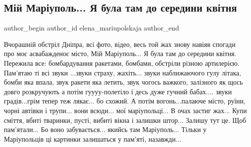  
 
 
 
 

\subsection{Мій Маріуполь... Я була там до середини квітня}
\label{sec:27_05_2023.fb.elena_mariupolskaja.1.mij_mariupol_ja_bula_tam_do_seredyny_kvitnja}

\ifcmt
 author_begin
   author_id elena_mariupolskaja
 author_end
\fi

Вчорашній обстріл Дніпра, всі фото, відео, весь той жах знову навіяв спогади про
моє асвабажденоє місто, Мій Маріуполь... Я була там до середини квітня. Пережила
все: бомбардування ракетами, бомбами, обстріли різною артилерією. Пам'ятаю ті
всі звуки ...звуки страху, жахіть... звуки наближаючого гулу літака, бомби яка
впала, звук ракети яка летить, звук чогось важкого, залізного як щось довго
розкручують а потім гуууу-полетіло і десь дуже гучний бабах.... звуки
градів...грім тепер теж лякає... бо схожий. А потім вогонь...палаюче місто,
руїни, чорні автівки і трупи... вони всюди... мої  маріупольці... В очах застиг
жах... Купи сміття, вбиті тваринки, пусті, вибиті вікна і залишки штор... Залишу
тут це. Щоб пам'ятали... Бо воно забувається... якийсь там Маріуполь... Тільки у
Маріупольців ці картинки залишаться у пам'яті, назавжди...
